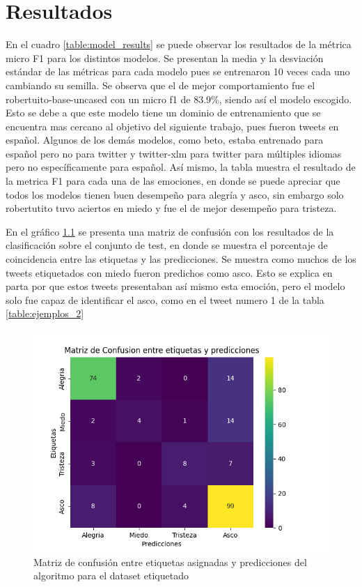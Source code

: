 \chapter{Resultados}



En el cuadro \ref{table:model_results} se puede observar los resultados de la métrica micro F1 para los distintos modelos. Se presentan la media y la desviación estándar de las métricas para cada modelo pues se entrenaron 10 veces cada uno cambiando su semilla. Se observa que el de mejor comportamiento fue el robertuito-base-uncased con un micro f1 de 83.9\%, siendo así el modelo escogido. Esto se debe a que este modelo tiene un dominio de entrenamiento que se encuentra mas cercano al objetivo del siguiente trabajo, pues fueron tweets en español. Algunos de los demás modelos, como beto, estaba entrenado para español pero no para twitter y twitter-xlm para twitter para múltiples idiomas pero no específicamente para español. Así mismo, la tabla muestra el resultado de la metrica F1 para cada una de las emociones, en donde se puede apreciar que todos los modelos tienen buen desempeño para alegría y asco, sin embargo solo robertutito tuvo aciertos en miedo y fue el de mejor desempeño para tristeza.








En el gráfico \ref{figure:Matriz} se presenta una matriz de confusión con los resultados de la clasificación sobre el conjunto de test, en donde se muestra el porcentaje de coincidencia entre las etiquetas y las predicciones. Se muestra como muchos de los tweets etiquetados con miedo fueron predichos como asco. Esto se explica en parta por que estos tweets presentaban así mismo esta emoción, pero el modelo solo fue capaz de identificar el asco, como en el tweet numero 1 de la tabla \ref{table:ejemplos_2}



	
\begin{figure}[t]
	\centering
	\includegraphics{Images & Logos/Results/Matriz_confusion.png} 
	\caption{Matriz de confusión entre etiquetas asignadas y predicciones del algoritmo para el dataset etiquetado}
	\label{figure:Matriz}
\end{figure}

